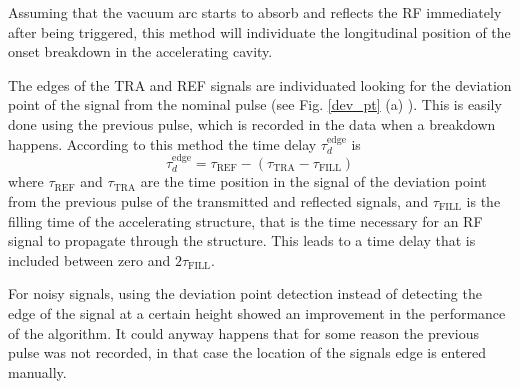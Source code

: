 Assuming that the vacuum arc starts to absorb and reflects the RF immediately after being triggered, this method will individuate the longitudinal position of the onset breakdown in the accelerating cavity.

The edges of the TRA and REF signals are individuated looking for the deviation point of the signal from the nominal pulse (see Fig. \ref{dev_pt} (a) ). This is easily done using the previous pulse, which is recorded in the data when a breakdown happens.  According to this method the time delay $\tau_d^{\text{edge}}$ is
\begin{equation}
\tau_d^{\text{edge}} = \tau_{\text{REF}} - (\tau_{\text{TRA}} - \tau_{\text{FILL}})
\end{equation}
where $\tau_{\text{REF}} $ and $\tau_{\text{TRA}}$ are the time position in the signal of the deviation point from the previous pulse of the transmitted and reflected signals, and $\tau_{\text{FILL}}$ is the filling time of the accelerating structure, that is the time necessary for an RF signal to propagate through the structure. This leads to a time delay that is included between zero and $2 \tau_{\text{FILL}}$.

For noisy signals, using the deviation point detection instead of detecting the edge of the signal at a certain height showed an improvement in the performance of the algorithm. It could anyway happens that for some reason the previous pulse was not recorded, in that case the location of the signals edge is entered manually.


